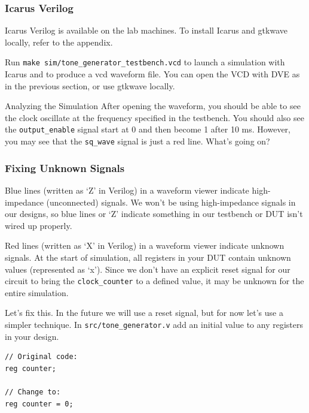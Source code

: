\documentclass[11pt]{article}
\makeatletter
\renewcommand{\subsection}
{\@startsection {subsection}{1}{0pt}
 {-1ex}
 {0.5ex}
 {\bfseries\normalsize}}
\makeatother
\begin{document}
\subsubsection{Icarus Verilog}
Icarus Verilog is available on the lab machines.
To install Icarus and gtkwave locally, refer to the appendix.

Run \verb|make sim/tone_generator_testbench.vcd| to launch a simulation with Icarus and to produce a vcd waveform file.
You can open the VCD with DVE as in the previous section, or use gtkwave locally.

\subsection{Analyzing the Simulation}
After opening the waveform, you should be able to see the clock oscillate at the frequency specified in the testbench.
You should also see the \verb|output_enable| signal start at 0 and then become 1 after 10 ms.
However, you may see that the \verb|sq_wave| signal is just a red line. What's going on?

\subsubsection{Fixing Unknown Signals}
Blue lines (written as `Z' in Verilog) in a waveform viewer indicate high-impedance (unconnected) signals.
We won't be using high-impedance signals in our designs, so blue lines or `Z' indicate something in our testbench or DUT isn't wired up properly.

Red lines (written as `X' in Verilog) in a waveform viewer indicate unknown signals.
At the start of simulation, all registers in your DUT contain unknown values (represented as `x').
Since we don't have an explicit reset signal for our circuit to bring the \verb|clock_counter| to a defined value, it may be unknown for the entire simulation.

Let's fix this. In the future we will use a reset signal, but for now let's use a simpler technique. In \verb|src/tone_generator.v| add an initial value to any registers in your design.
\begin{verbatim}
// Original code:
reg counter;

// Change to:
reg counter = 0;
\end{verbatim}
\end{document}
